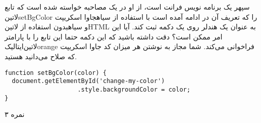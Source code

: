 
سپهر یک برنامه نویس فرانت است، از او در یک مصاحبه خواسته شده است
که تابع ‌لاتین{setBgColor}
را که تعریف آن در ادامه آمده است با استفاده از ‌سیاه{جاوا اسکریپت}
و ‌سیاه{بدون}
استفاده از ‌لاتین{HTML}
به عنوان یک هندلر روی یک دکمه ثبت کند. آیا این امر ممکن است؟
دقت داشته باشید که این دکمه حتما این تابع را با پارامتر ‌لاتین{‌ایتالیک{orange}}
فراخوانی می‌کند.
شما مجاز به نوشتن هر میزان کد جاوا اسکریپت که صلاح می‌دانید هستید.

\begin{latin}
\begin{verbatim}
function setBgColor(color) {
  document.getElementById('change-my-color')
                    .style.backgroundColor = color;
}
\end{verbatim}
\end{latin}

۳ نمره
